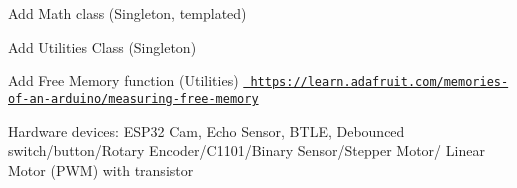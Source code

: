
\begin{DoxyRefList}
\item[page \mbox{\hyperlink{index}{Ardu\+Forge\+: A library of classes to use with Arduino compatible microcontrollers (Uno/\+Nano/\+E\+S\+P32/...)}} ]\label{todo__todo000001}%
%
Add Math class (Singleton, templated) 

\label{todo__todo000002}%
%
Add Utilities Class (Singleton) 

\label{todo__todo000003}%
%
Add Free Memory function (Utilities) \href{https://learn.adafruit.com/memories-of-an-arduino/measuring-free-memory}{\texttt{ https\+://learn.\+adafruit.\+com/memories-\/of-\/an-\/arduino/measuring-\/free-\/memory}} 

\label{todo__todo000004}%
%
Hardware devices\+: E\+S\+P32 Cam, Echo Sensor, B\+T\+LE, Debounced switch/button/\+Rotary Encoder/\+C1101/\+Binary Sensor/\+Stepper Motor/ Linear Motor (P\+WM) with transistor
\end{DoxyRefList}